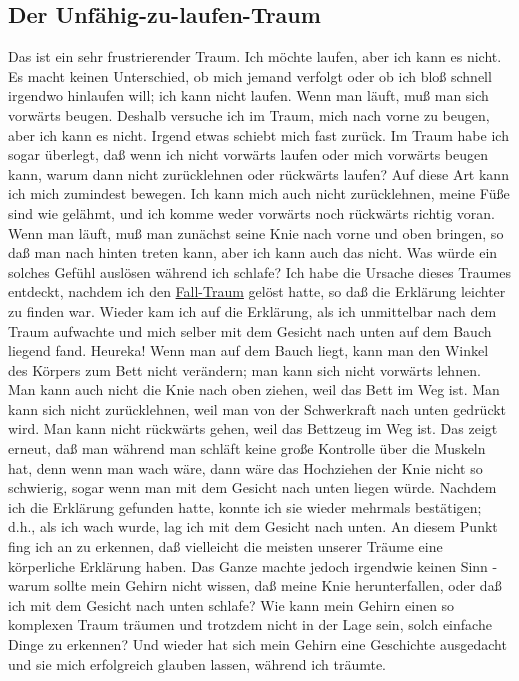 \subsection{Der Unfähig-zu-laufen-Traum}

Das ist ein sehr frustrierender Traum.
 Ich möchte laufen, aber ich kann es nicht.
 Es macht keinen Unterschied, ob mich jemand verfolgt oder ob ich bloß schnell irgendwo hinlaufen will; ich kann nicht laufen.
 Wenn man läuft, muß man sich vorwärts beugen.
 Deshalb versuche ich im Traum, mich nach vorne zu beugen, aber ich kann es nicht.
 Irgend etwas schiebt mich fast zurück.
 Im Traum habe ich sogar überlegt, daß wenn ich nicht vorwärts laufen oder mich vorwärts beugen kann, warum dann nicht zurücklehnen oder rückwärts laufen?
 Auf diese Art kann ich mich zumindest bewegen.
 Ich kann mich auch nicht zurücklehnen, meine Füße sind wie gelähmt, und ich komme weder vorwärts noch rückwärts richtig voran.
 Wenn man läuft, muß man zunächst seine Knie nach vorne und oben bringen, so daß man nach hinten treten kann, aber ich kann auch das nicht.
 Was würde ein solches Gefühl auslösen während ich schlafe?
 Ich habe die Ursache dieses Traumes entdeckt, nachdem ich den \hyperlink{c3_5b}{Fall-Traum} gelöst hatte, so daß die Erklärung leichter zu finden war.
 Wieder kam ich auf die Erklärung, als ich unmittelbar nach dem Traum aufwachte und mich selber mit dem Gesicht nach unten auf dem Bauch liegend fand. Heureka!
 Wenn man auf dem Bauch liegt, kann man den Winkel des Körpers zum Bett nicht verändern; man kann sich nicht vorwärts lehnen.
 Man kann auch nicht die Knie nach oben ziehen, weil das Bett im Weg ist.
 Man kann sich nicht zurücklehnen, weil man von der Schwerkraft nach unten gedrückt wird.
 Man kann nicht rückwärts gehen, weil das Bettzeug im Weg ist.
 Das zeigt erneut, daß man während man schläft keine große Kontrolle über die Muskeln hat, denn wenn man wach wäre, dann wäre das Hochziehen der Knie nicht so schwierig, sogar wenn man mit dem Gesicht nach unten liegen würde.
 Nachdem ich die Erklärung gefunden hatte, konnte ich sie wieder mehrmals bestätigen; d.h., als ich wach wurde, lag ich mit dem Gesicht nach unten.
 An diesem Punkt fing ich an zu erkennen, daß vielleicht die meisten unserer Träume eine körperliche Erklärung haben.
 Das Ganze machte jedoch irgendwie keinen Sinn - warum sollte mein Gehirn nicht wissen, daß meine Knie herunterfallen, oder daß ich mit dem Gesicht nach unten schlafe?
 Wie kann mein Gehirn einen so komplexen Traum träumen und trotzdem nicht in der Lage sein, solch einfache Dinge zu erkennen?
 Und wieder hat sich mein Gehirn eine Geschichte ausgedacht und sie mich erfolgreich glauben lassen, während ich träumte.
 \hypertarget{c3_5d}{}

